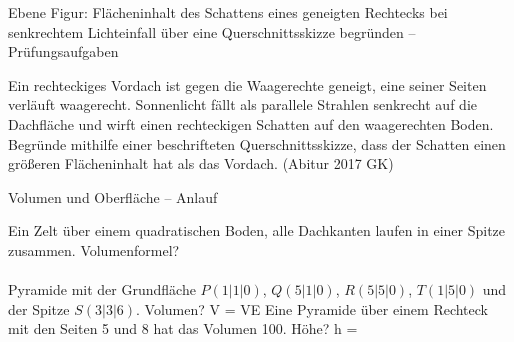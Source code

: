 \begin{aufgabe}{Ebene Figur: Flächeninhalt des Schattens eines geneigten Rechtecks bei senkrechtem Lichteinfall über eine Querschnittsskizze begründen – Prüfungsaufgaben}
\begin{teile}
\teil Ein rechteckiges Vordach ist gegen die Waagerechte geneigt, eine seiner Seiten verläuft waagerecht. Sonnenlicht fällt als parallele Strahlen senkrecht auf die Dachfläche und wirft einen rechteckigen Schatten auf den waagerechten Boden. Begründe mithilfe einer beschrifteten Querschnittsskizze, dass der Schatten einen größeren Flächeninhalt hat als das Vordach. \hfill (Abitur 2017 GK)
\end{teile}
\end{aufgabe}

\begin{aufgabe}{Volumen und Oberfläche – Anlauf}
\begin{teile}
\teil Ein Zelt über einem quadratischen Boden, alle Dachkanten laufen in einer Spitze zusammen. Volumenformel? \\  \\ 
\teil Pyramide mit der Grundfläche $P(1 | 1 | 0)$, $Q(5 | 1 | 0)$, $R(5 | 5 | 0)$, $T(1 | 5 | 0)$ und der Spitze $S(3 | 3 | 6)$. Volumen? V = \leerfeld VE
\teil Eine Pyramide über einem Rechteck mit den Seiten 5 und 8 hat das Volumen 100. Höhe? h = \leerfeld
\end{teile}
\end{aufgabe}


